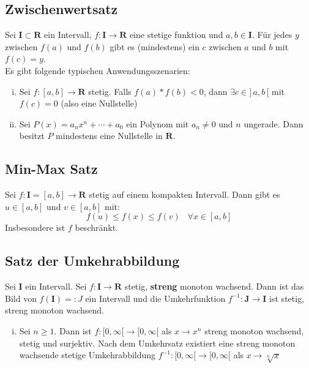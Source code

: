 \documentclass[8pt]{article}
\begin{document}
\begin{multicols*}{3}
\subsection{Zwischenwertsatz}

Sei $\mathbf{I} \subset \mathbf{R}$ ein Intervall, $f:\mathbf{I} \rightarrow \mathbf{R}$ eine
stetige funktion und $a, b \in \mathbf{I}$. Für jedes $y$ zwischen $f(a)$ und $f(b)$
gibt es (mindestens) ein $c$ zwischen $a$ und $b$ mit $f(c) = y$.\\
Es gibt folgende typischen Anwendungsszenarien:
\begin{enumerate}[(i)]
  \item Sei $f:[a, b] \rightarrow \mathbf{R}$ stetig. Falls $f(a)*f(b) < 0$, dann
  $\exists c \in ]\,a, b\,[$ mit $f(c) = 0$ (also eine Nullstelle)
  \item Sei $P(x) = a_nx^n + \cdots + a_0$ ein Polynom mit $a_n \neq 0$ und $n$ ungerade.
  Dann besitzt $P$ mindestens eine Nullstelle in $\mathbf{R}$.
\end{enumerate}

\subsection{Min-Max Satz}

Sei $f:\mathbf{I}=[a, b] \rightarrow \mathbf{R}$ stetig auf einem kompakten Intervall.
Dann gibt es $u \in [a, b]$ und $v \in [a, b]$ mit:
$$
  f(u) \leq f(x) \leq f(v) \;\;\; \forall x \in [a, b]
$$
Insbesondere ist $f$ beschränkt.

\subsection{Satz der Umkehrabbildung}

Sei $\mathbf{I}$ ein Intervall. Sei $f:\mathbf{{I} \rightarrow \mathbf{R}}$ stetig, \textbf{streng} monoton
wachsend. Dann ist das Bild von $f(\mathbf{I}) =: J$ ein Intervall und die Umkehrfunktion
$f^{-1}: \mathbf{J} \rightarrow \mathbf{I}$ ist stetig, streng monoton wachsend.
\begin{enumerate}[(i)]
  \item Sei $n \geq 1$. Dann ist $f:[0, \infty[ \rightarrow [0, \infty[$ als $x \rightarrow x^n$
  streng monoton wachsend, stetig und surjektiv. Nach dem Umkehrsatz existiert eine streng monoton
  wachsende stetige Umkehrabbildung $f^{-1}:[0, \infty[ \rightarrow [0, \infty[$ als $x \rightarrow \sqrt[n]{x}$
\end{enumerate}


\end{multicols*}
\end{document}
